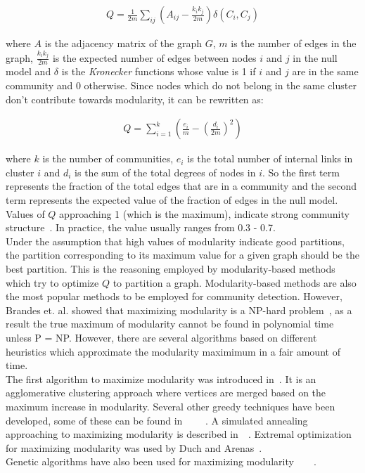 \begin{spacing}{1.5}
\begin{align}
Q = \frac{1}{2m}\displaystyle\sum_{ij}\left(A_{ij} - \frac{k_i k_j}{2m}\right) \delta(C_i, C_j)
\end{align}

where $A$ is the adjacency matrix of the graph $G$, $m$ is the number of edges in the graph, $\frac{k_i k_j}{2m}$ is the expected number of edges between nodes $i$ and $j$ in the null model and $\delta$ is the \emph{Kronecker} functions whose value is 1 if $i$ and $j$ are in the same community and 0 otherwise. Since nodes which do not belong in the same cluster don't contribute towards modularity, it can be rewritten as:

\begin{align}
Q = \displaystyle\sum_{i = 1}^k\left(\frac{e_i}{m} - \left(\frac{d_i}{2m}\right)^2\right)
\end{align}

where $k$ is the number of communities, $e_i$ is the total number of internal links in cluster $i$ and $d_i$ is the sum of the total degrees of nodes in $i$. So the first term represents the fraction of the total edges that are in a community and the second term represents the expected value of the fraction of edges in the null model. Values of $Q$ approaching 1 (which is the maximum), indicate strong community structure~\cite{PhysRevE.69.026113}. In practice, the value usually ranges from 0.3 - 0.7. \\
\indent Under the assumption that high values of modularity indicate good partitions, the partition corresponding to its maximum value for a given graph should be the best partition. This is the reasoning employed by modularity-based methods which try to optimize $Q$ to partition a graph. Modularity-based methods are also the most popular methods to be employed for community detection. However, Brandes et. al. showed that maximizing modularity is a NP-hard problem~\cite{10.1109/TKDE.2007.190689}, as a result the true maximum of modularity cannot be found in polynomial time unless P = NP. However, there are several algorithms based on different heuristics which approximate the modularity maximimum in a fair amount of time.\\
\indent The first algorithm to maximize modularity was introduced in~\cite{newman03fast}. It is an agglomerative clustering approach where vertices are merged based on the maximum increase in modularity. Several other greedy techniques have been developed, some of these can be found in~\cite{blondel2008fuc}~\cite{Clauset2004}~\cite{Newman06062006}~\cite{PhysRevE.74.016107} . A simulated annealing approaching to maximizing modularity is described in~\cite{Guimera04simulatedAnnealingNetworks}~\cite{PhysRevE.71.046101}. Extremal optimization for maximizing modularity was used by Duch and Arenas~\cite{duch-2005-72}.\\
\indent Genetic algorithms have also been used for maximizing modularity~\cite{Tasgin06gaCommunityDetection}~\cite{2008ppsnpizzuti}~\cite{6045331}~\cite{Pizzuti:2012:BDM:2245276.2245321}.


\end{spacing}
